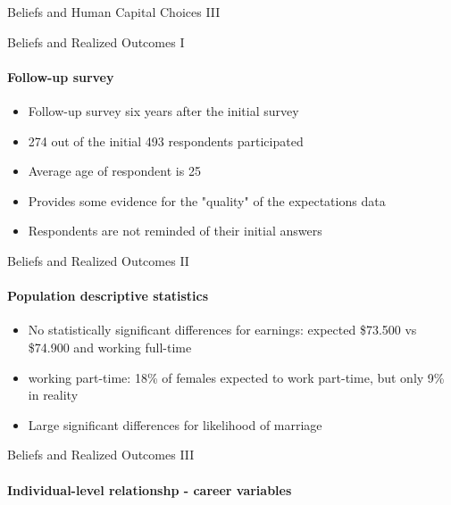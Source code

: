 \documentclass[12pt]{beamer}
\begin{document}
\begin{frame}{Beliefs and Human Capital Choices III}
    \begin{center}
    \end{center}
\end{frame}


\begin{frame}{Beliefs and Realized Outcomes I}
    \framesubtitle{Follow-up survey}
    \begin{itemize}
        \item Follow-up survey six years after the initial survey
        \item 274 out of the initial 493 respondents participated
        \item Average age of respondent is 25
        \item Provides some evidence for the "quality" of the expectations data
        \item Respondents are not reminded of their initial answers
    \end{itemize}
    
\end{frame}

\begin{frame}{Beliefs and Realized Outcomes II}
    \framesubtitle{Population descriptive statistics}
    \begin{itemize}
        \item No statistically significant differences for earnings: expected \$73.500 vs \$74.900
         and working full-time
        \item working part-time: 18\% of females expected to work part-time, but only 9\% in reality
        \item Large significant differences for likelihood of marriage
    \end{itemize}
\end{frame}

\begin{frame}{Beliefs and Realized Outcomes III}
    \framesubtitle{Individual-level relationshp - career variables}
\end{frame}
\end{document}

